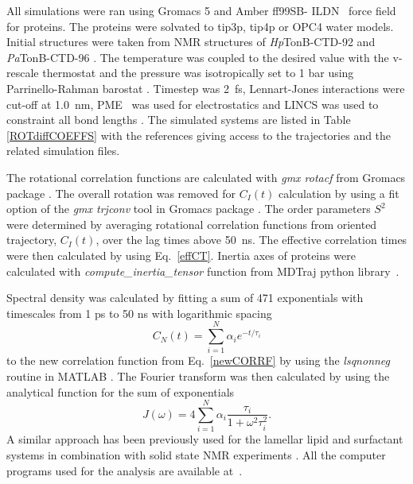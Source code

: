 \documentclass[journal=jpcbfk,manuscript=article]{achemso}
\begin{document}
All simulations were ran using Gromacs 5 \cite{abraham15}
and Amber ff99SB- ILDN~\cite{lindorff10} force field for proteins. The proteins were solvated
to tip3p\cite{jorgensen83}, tip4p \cite{jorgensen83} or OPC4 \cite{izadi14} water models.
Initial structures were taken from NMR structures of {\it Hp}TonB-CTD-92 \cite{ciragan16} and
{\it Pa}TonB-CTD-96 \cite{oeemig17}.
The temperature was coupled to the desired value with the v-rescale thermostat \cite{bussi07} and the pressure was 
isotropically set to 1 bar using Parrinello-Rahman barostat \cite{parrinello81}.
Timestep was 2~fs, Lennart-Jones interactions were cut-off at 1.0~nm,
PME~\cite{darden93,essman95} was used for electrostatics and LINCS was used
to constraint all bond lengths \cite{hess07}. The simulated systems are listed
in Table \ref{ROTdiffCOEFFS} with the references giving access to the trajectories
and the related simulation files.


The rotational correlation functions are calculated with {\it gmx rotacf} from
Gromacs package \cite{gromacsMANUAL}. The overall rotation was removed
for $C_I(t)$ calculation by using a fit option of the {\it gmx trjconv} tool
in Gromacs package \cite{gromacsMANUAL}. The order parameters $S^2$
were determined by averaging rotational correlation functions from
oriented trajectory, $C_I(t)$, over the lag times above 50~ns.
The effective correlation times were then calculated by using Eq.~\ref{effCT}. 
Inertia axes of proteins were calculated with {\it compute\_inertia\_tensor}
function from MDTraj python library~\cite{McGibbon2015MDTraj}.

Spectral density was calculated by fitting a
sum of 471 exponentials with timescales from 1 ps to 50 ns
with logarithmic spacing
\begin{equation}\label{gprime_fit}
C_N(t)=\sum_{i=1}^{N}\alpha_i e^{-t/\tau_i}
\end{equation}
to the new correlation function from Eq.~\ref{newCORRF}
by using the {\it lsqnonneg} routine in MATLAB \cite{matlab}.
The Fourier transform was then calculated by using the analytical function
for the sum of exponentials 
\begin{equation}\label{FTanal}
J(\omega) =  4 \sum_{i=1}^{N}\alpha_i\frac{\tau_i}{1+\omega^2\tau_i^2}.
\end{equation}
A similar approach has been previously used for the lamellar lipid and surfactant
systems in combination with solid state NMR experiments \cite{nowacka13,ferreira15}.
All the computer programs used for the analysis are available at~\cite{proteindynamicsGIT}.
\end{document}
